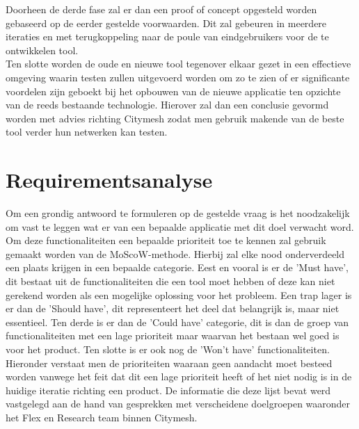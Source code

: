 Doorheen de derde fase zal er dan een proof of concept opgesteld worden gebaseerd op de eerder gestelde voorwaarden. Dit zal gebeuren in meerdere iteraties en met terugkoppeling naar de poule van eindgebruikers voor de te ontwikkelen tool. \\

Ten slotte worden de oude en nieuwe tool tegenover elkaar gezet in een effectieve omgeving waarin testen zullen uitgevoerd worden om zo te zien of er significante voordelen zijn geboekt bij het opbouwen van de nieuwe applicatie ten opzichte van de reeds bestaande technologie. Hierover zal dan een conclusie gevormd worden met advies richting Citymesh zodat men gebruik makende van de beste tool verder hun netwerken kan testen.

\section{Requirementsanalyse}

Om een grondig antwoord te formuleren op de gestelde vraag is het noodzakelijk om vast te leggen wat er van een bepaalde applicatie met dit doel verwacht word. Om deze functionaliteiten een bepaalde prioriteit toe te kennen zal gebruik gemaakt worden van de MoScoW-methode. Hierbij zal elke nood onderverdeeld een plaats krijgen in een bepaalde categorie. Eest en vooral is er de 'Must have', dit bestaat uit de functionaliteiten die een tool moet hebben of deze kan niet gerekend worden als een mogelijke oplossing voor het probleem. Een trap lager is er dan de 'Should have', dit representeert het deel dat belangrijk is, maar niet essentieel. Ten derde is er dan de 'Could have' categorie, dit is dan de groep van functionaliteiten met een lage prioriteit maar waarvan het bestaan wel goed is voor het product. Ten slotte is er ook nog de 'Won't have' functionaliteiten. Hieronder verstaat men de prioriteiten waaraan geen aandacht moet besteed worden vanwege het feit dat dit een lage prioriteit heeft of het niet nodig is in de huidige iteratie richting een product. \autocite{Khan2015} De informatie die deze lijst bevat werd vastgelegd aan de hand van gesprekken met verscheidene doelgroepen waaronder het Flex en Research team binnen Citymesh.

